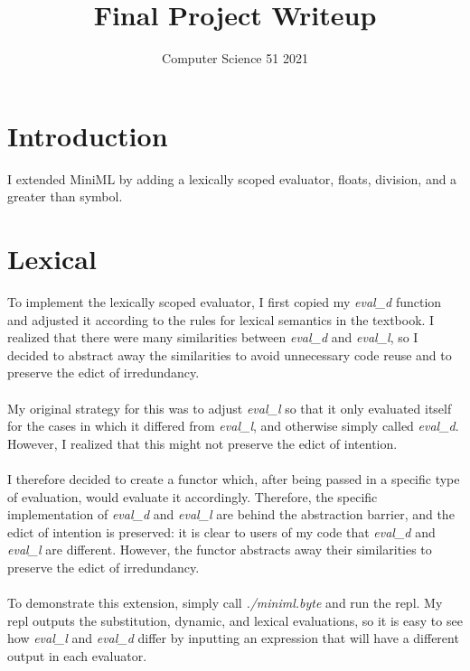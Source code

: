 \documentclass{article}
\title{Final Project Writeup}
\author{Computer Science 51 2021}
\begin{document}
\maketitle

\section{Introduction}
I extended MiniML by adding a lexically scoped evaluator, floats, division, and a greater than symbol. 
\section{Lexical}
To implement the lexically scoped evaluator, I first copied my \textit{eval\_d} function and adjusted it according to the rules for lexical semantics in the textbook. I realized that there were many similarities between \textit{eval\_d} and \textit{eval\_l}, so I decided to abstract away the similarities to avoid unnecessary code reuse and to preserve the edict of irredundancy. \\\\
My original strategy for this was to adjust \textit{eval\_l} so that it only evaluated itself for the cases in which it differed from \textit{eval\_l}, and otherwise simply called \textit{eval\_d}. However, I realized that this might not preserve the edict of intention.\\\\ I therefore decided to create a functor which, after being passed in a specific type of evaluation, would evaluate it accordingly. Therefore, the specific implementation of \textit{eval\_d} and \textit{eval\_l} are behind the abstraction barrier, and the edict of intention is preserved: it is clear to users of my code that \textit{eval\_d} and \textit{eval\_l} are different. However, the functor abstracts away their similarities to preserve the edict of irredundancy. \\\\
To demonstrate this extension, simply call \textit{./miniml.byte} and run the repl. My repl outputs the substitution, dynamic, and lexical evaluations, so it is easy to see how \textit{eval\_l} and \textit{eval\_d} differ by inputting an expression that will have a different output in each evaluator.
\end{document}
